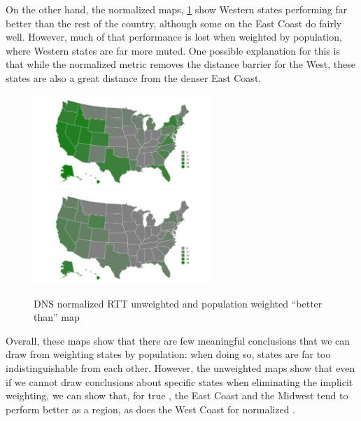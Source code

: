 On the other hand, the normalized maps, \cref{fig:dns_auth_agg_num_better_map_norm_rtt} show Western states performing far better than the rest of the country, although some on the East Coast do fairly well. However, much of that performance is lost when weighted by population, where Western states are far more muted. One possible explanation for this is that while the normalized metric removes the distance barrier for the West, these states are also a great distance from the denser East Coast.

\begin{figure}[htb]
    \centering
    \includegraphics[width=0.6\textwidth]{images/dns/analysis_auth_agg/rtt_normalized/unweighted/num_better_than_map_norm_rtt_un.png}\\
    \includegraphics[width=0.6\textwidth]{images/dns/analysis_auth_agg/rtt_normalized/population/num_better_than_map_norm_rtt_pop.png}
    \caption{DNS normalized RTT unweighted  and population weighted ``better than'' map}
    \label{fig:dns_auth_agg_num_better_map_norm_rtt}
\end{figure}

Overall, these maps show that there are few meaningful conclusions that we can draw from weighting states by population: when doing so, states are far too indistinguishable from each other. However, the unweighted maps show that even if we cannot draw conclusions about specific states when eliminating the implicit \dns weighting, we can show that, for true \rtt, the East Coast and the Midwest tend to perform better as a region, as does the West Coast for normalized \rtt.

\FloatBarrier

